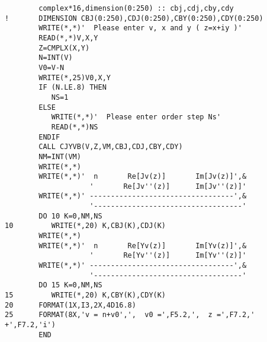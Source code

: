 \documentclass [11pt,spanish]{article}
\begin{document}
\begin{shaded}
\begin{verbatim}
        complex*16,dimension(0:250) :: cbj,cdj,cby,cdy
!       DIMENSION CBJ(0:250),CDJ(0:250),CBY(0:250),CDY(0:250)
        WRITE(*,*)'  Please enter v, x and y ( z=x+iy )'
        READ(*,*)V,X,Y
        Z=CMPLX(X,Y)
        N=INT(V)
        V0=V-N
        WRITE(*,25)V0,X,Y
        IF (N.LE.8) THEN
           NS=1
        ELSE
           WRITE(*,*)'  Please enter order step Ns'
           READ(*,*)NS
        ENDIF
        CALL CJYVB(V,Z,VM,CBJ,CDJ,CBY,CDY)
        NM=INT(VM)
        WRITE(*,*)
        WRITE(*,*)'  n       Re[Jv(z)]       Im[Jv(z)]',&
                    '       Re[Jv''(z)]      Im[Jv''(z)]'
        WRITE(*,*)' ----------------------------------',&
                    '-----------------------------------'
        DO 10 K=0,NM,NS
10         WRITE(*,20) K,CBJ(K),CDJ(K)
        WRITE(*,*)
        WRITE(*,*)'  n       Re[Yv(z)]       Im[Yv(z)]',&
                    '       Re[Yv''(z)]      Im[Yv''(z)]'
        WRITE(*,*)' ----------------------------------',&
                    '-----------------------------------'
        DO 15 K=0,NM,NS
15         WRITE(*,20) K,CBY(K),CDY(K)
20      FORMAT(1X,I3,2X,4D16.8)
25      FORMAT(8X,'v = n+v0',',  v0 =',F5.2,',  z =',F7.2,' +',F7.2,'i')
        END
\end{verbatim}
\end{shaded}
\endgroup
\end{document}
